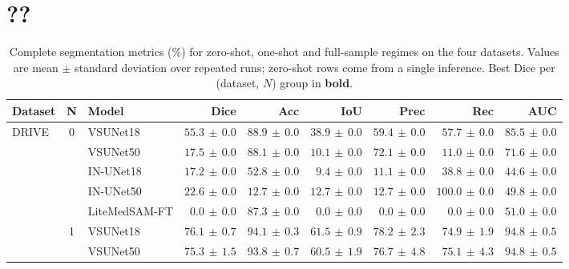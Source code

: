 \documentclass[%
reprint,
nofootinbib,
 amsmath,amssymb,
aps,
superscriptaddress,
showkeys,
longbibliography
]{revtex4-1}
\begin{document}
\renewcommand{\thetable}{\thesection\arabic{table}}
\renewcommand{\theHtable}{\thesection.\arabic{table}}
\setcounter{table}{0} %

\section{??}
\label{app:aug}

\begin{table}[t]
    \caption{Complete segmentation metrics (\%) for zero-shot, one-shot and full-sample regimes on the four datasets. Values are mean $\pm$ standard deviation over repeated runs; zero-shot rows come from a single inference. Best Dice per (dataset, $N$) group in \textbf{bold}.}
    \label{tab:full_metrics_appendix}
    \centering
    \begingroup
    \footnotesize
    \setlength{\tabcolsep}{3pt}
    \renewcommand{\arraystretch}{1.12}
\begin{tabular}{l c l r r r r r r}
\hline
\textbf{Dataset} & \textbf{N} & \textbf{Model} & \textbf{Dice} & \textbf{Acc} & \textbf{IoU} & \textbf{Prec} & \textbf{Rec} & \textbf{AUC} \\
\hline
\multirow{17}{*}{DRIVE} & \multirow{5}{*}{0} & VSUNet18 & $\mathbf{55.3} \,\pm\, 0.0$ & $88.9 \,\pm\, 0.0$ & $38.9 \,\pm\, 0.0$ & $59.4 \,\pm\, 0.0$ & $57.7 \,\pm\, 0.0$ & $85.5 \,\pm\, 0.0$ \\
 &  & VSUNet50 & $17.5 \,\pm\, 0.0$ & $88.1 \,\pm\, 0.0$ & $10.1 \,\pm\, 0.0$ & $72.1 \,\pm\, 0.0$ & $11.0 \,\pm\, 0.0$ & $71.6 \,\pm\, 0.0$ \\
 &  & IN-UNet18 & $17.2 \,\pm\, 0.0$ & $52.8 \,\pm\, 0.0$ & $9.4 \,\pm\, 0.0$ & $11.1 \,\pm\, 0.0$ & $38.8 \,\pm\, 0.0$ & $44.6 \,\pm\, 0.0$ \\
 &  & IN-UNet50 & $22.6 \,\pm\, 0.0$ & $12.7 \,\pm\, 0.0$ & $12.7 \,\pm\, 0.0$ & $12.7 \,\pm\, 0.0$ & $100.0 \,\pm\, 0.0$ & $49.8 \,\pm\, 0.0$ \\
 &  & LiteMedSAM-FT & $0.0 \,\pm\, 0.0$ & $87.3 \,\pm\, 0.0$ & $0.0 \,\pm\, 0.0$ & $0.0 \,\pm\, 0.0$ & $0.0 \,\pm\, 0.0$ & $51.0 \,\pm\, 0.0$ \\
\cline{2-9}
 & \multirow{7}{*}{1} & VSUNet18 & $\mathbf{76.1} \,\pm\, 0.7$ & $94.1 \,\pm\, 0.3$ & $61.5 \,\pm\, 0.9$ & $78.2 \,\pm\, 2.3$ & $74.9 \,\pm\, 1.9$ & $94.8 \,\pm\, 0.5$ \\
 &  & VSUNet50 & $75.3 \,\pm\, 1.5$ & $93.8 \,\pm\, 0.7$ & $60.5 \,\pm\, 1.9$ & $76.7 \,\pm\, 4.8$ & $75.1 \,\pm\, 4.3$ & $94.8 \,\pm\, 0.5$ \\

\end{tabular}
\end{table}
\end{document}
